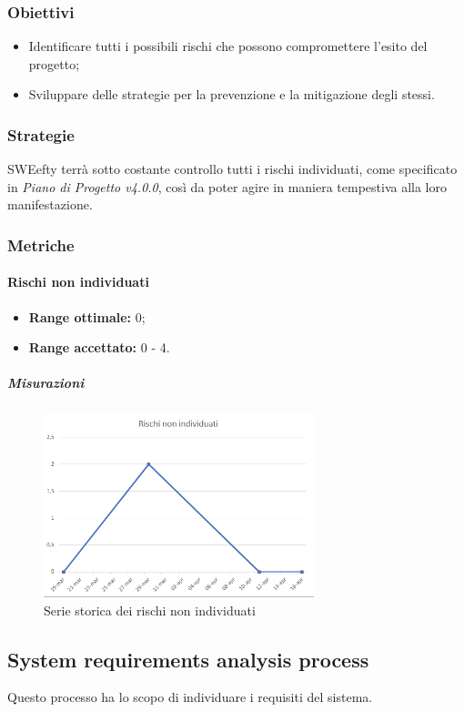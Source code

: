 \subsubsection{Obiettivi}
\begin{itemize}
	\item Identificare tutti i possibili rischi che possono compromettere l'esito del progetto;
	\item Sviluppare delle strategie per la prevenzione e la mitigazione degli stessi.
\end{itemize}
\subsubsection{Strategie}
SWEefty terrà sotto costante controllo tutti i rischi individuati, come specificato in \emph{Piano di Progetto v4.0.0}, così da poter agire in maniera tempestiva alla loro manifestazione.

\subsubsection{Metriche}
\paragraph{Rischi non individuati} \Spazio
	\begin{itemize}
		\item \textbf{Range ottimale: }0;
		\item \textbf{Range accettato: }0 - 4.
	\end{itemize}
    \subparagraph{Misurazioni}
    \begin{figure}[H]
    	\centering 
    	\includegraphics[width=0.7\textwidth]{Images/rischiNI.png}
    	\caption{Serie storica dei rischi non individuati}
    	\label{rischi} 
    \end{figure}

\subsection{System requirements analysis process}
Questo processo ha lo scopo di individuare i requisiti del sistema.
